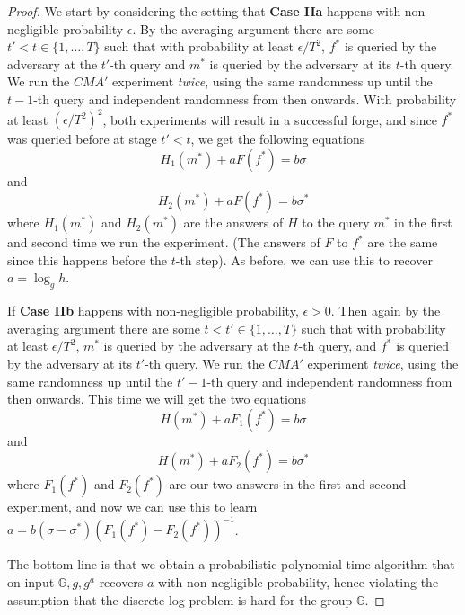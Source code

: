\begin{proof}
We start by considering the setting that \textbf{Case IIa} happens with
non-negligible probability \(\epsilon\). By the averaging argument there
are some \(t'< t \in \{1,\ldots,T\}\) such that with probability at
least \(\epsilon/T^2\), \(f^*\) is queried by the adversary at the
\(t'\)-th query and \(m^*\) is queried by the adversary at its \(t\)-th
query. We run the \(\ensuremath{\mathit{CMA}}'\) experiment
\emph{twice}, using the same randomness up until the \(t-1\)-th query
and independent randomness from then onwards. With probability at least
\((\epsilon/T^2)^2\), both experiments will result in a successful
forge, and since \(f^*\) was queried before at stage \(t'<t\), we get
the following equations
\begin{equation*}
H_1(m^*)+aF(f^*) = b\sigma
\end{equation*}
and
\begin{equation*}
H_2(m^*)+aF(f^*)=b\sigma^*
\end{equation*}
where \(H_1(m^*)\) and \(H_2(m^*)\) are the answers of \(H\) to the
query \(m^*\) in the first and second time we run the experiment. (The
answers of \(F\) to \(f^*\) are the same since this happens before the
\(t\)-th step). As before, we can use this to recover \(a=\log_g h\).

If \textbf{Case IIb} happens with non-negligible probability,
\(\epsilon>0\). Then again by the averaging argument there are some
\(t< t' \in \{1,\ldots,T\}\) such that with probability at least
\(\epsilon/T^2\), \(m^*\) is queried by the adversary at the \(t\)-th
query, and \(f^*\) is queried by the adversary at its \(t'\)-th query.
We run the \(\ensuremath{\mathit{CMA}}'\) experiment \emph{twice}, using
the same randomness up until the \(t'-1\)-th query and independent
randomness from then onwards. This time we will get the two equations
\begin{equation*}
H(m^*)+aF_1(f^*) = b\sigma
\end{equation*}
and
\begin{equation*}
H(m^*)+aF_2(f^*)=b\sigma^*
\end{equation*}
where \(F_1(f^*)\) and \(F_2(f^*)\) are our two answers in the first and
second experiment, and now we can use this to learn
\(a= b(\sigma-\sigma^*)(F_1(f^*)-F_2(f^*))^{-1}\).

The bottom line is that we obtain a probabilistic polynomial time
algorithm that on input \(\mathbb{G},g,g^a\) recovers \(a\) with
non-negligible probability, hence violating the assumption that the
discrete log problem is hard for the group \(\mathbb{G}\).

\end{proof}

